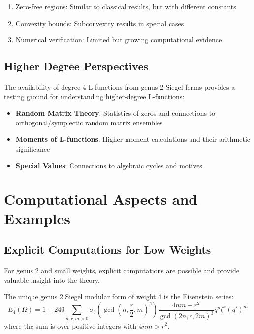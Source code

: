 \begin{theorem}
\label{thm:partial_results}
\begin{enumerate}
\item Zero-free regions: Similar to classical results, but with different constants
\item Convexity bounds: Subconvexity results in special cases
\item Numerical verification: Limited but growing computational evidence
\end{enumerate}
\end{theorem}

\subsection{Higher Degree Perspectives}

The availability of degree 4 L-functions from genus 2 Siegel forms provides a testing ground for understanding higher-degree L-functions:

\begin{itemize}
\item \textbf{Random Matrix Theory}: Statistics of zeros and connections to orthogonal/symplectic random matrix ensembles
\item \textbf{Moments of L-functions}: Higher moment calculations and their arithmetic significance  
\item \textbf{Special Values}: Connections to algebraic cycles and motives
\end{itemize}

\section{Computational Aspects and Examples}
\label{sec:computational}

\subsection{Explicit Computations for Low Weights}

For genus 2 and small weights, explicit computations are possible and provide valuable insight into the theory.

\begin{example}
The unique genus 2 Siegel modular form of weight 4 is the Eisenstein series:
\begin{equation}
E_4(\Omega) = 1 + 240 \sum_{n,r,m > 0} \sigma_3\left(\gcd\left(n,\frac{r}{2},m\right)^2\right) \frac{4nm-r^2}{\gcd(2n,r,2m)^3} q^n \zeta^r (q')^m
\end{equation}
where the sum is over positive integers with $4nm > r^2$.
\end{example}

